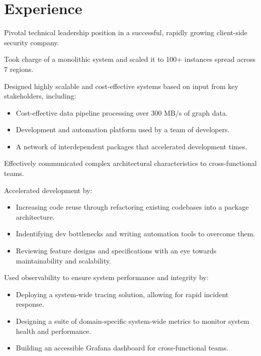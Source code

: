 \documentclass[a4paper,11pt]{article}
\begin{document}
\header%
\section{Experience}
\begin{sectionList}

  \begin{jobReflectizLead}
  \item Pivotal technical leadership position in a successful,
    rapidly growing client-side security company.
  \item Took charge of a monolithic system and scaled it to 100+
    instances spread across 7 regions.
  \item Designed highly scalable and cost-effective systems based on
    input from key stakeholders, including:
    \begin{itemize}
      \item Cost-effective data pipeline processing over 300 MB/s of graph data.
      \item Development and automation platform used by a team of developers.
      \item A network of interdependent packages that accelerated
        development times.
    \end{itemize}
  \item Effectively communicated complex architectural
    characteristics to cross-functional teams.
  \item Accelerated development by:
    \begin{itemize}
      \item Increasing code reuse through refactoring existing
        codebases into a package architecture.
      \item Indentifying dev bottlenecks and writing automation tools
        to overcome them.
      \item Reviewing feature designs and specifications with an eye
        towards maintainability and scalability.
    \end{itemize}
  \item Used observability to ensure system performance and integrity by:
    \begin{itemize}
      \item Deploying a system-wide tracing solution, allowing for
        rapid incident response.
      \item Designing a suite of domain-specific system-wide metrics
        to monitor system health and performance.
      \item Building an accessible Grafana dashboard for cross-functional teams.

\end{itemize}
\end{jobReflectizLead}
\end{sectionList}
\end{document}

